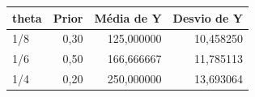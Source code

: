 \begin{tabular}{lrrr}
\toprule
theta & Prior & Média de Y & Desvio de Y \\
\midrule
1/8 & 0,30 & 125,000000 & 10,458250 \\
1/6 & 0,50 & 166,666667 & 11,785113 \\
1/4 & 0,20 & 250,000000 & 13,693064 \\
\bottomrule
\end{tabular}
